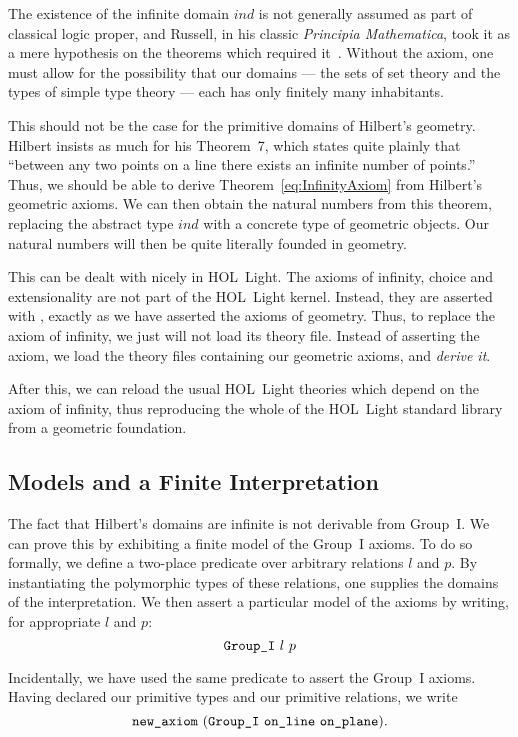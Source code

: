 The existence of the infinite domain $ind$ is not generally assumed as part of classical logic proper, and Russell, in his classic \emph{Principia Mathematica}, took it as a mere hypothesis on the theorems which required it~\cite{LogicismRevisited}. Without the axiom, one must allow for the possibility that our domains --- the sets of set theory and the types of simple type theory --- each has only finitely many inhabitants.

This should not be the case for the primitive domains of Hilbert's geometry. Hilbert insists as much for his Theorem~7, which states quite plainly that ``between any two points on a line there exists an infinite number of points.'' Thus, we should be able to derive Theorem~\ref{eq:InfinityAxiom} from Hilbert's geometric axioms. We can then obtain the natural numbers from this theorem, replacing the abstract type $ind$ with a concrete type of geometric objects. Our natural numbers will then be quite literally founded in geometry.

This can be dealt with nicely in HOL~Light. The axioms of infinity, choice and extensionality are not part of the HOL~Light kernel. Instead, they are asserted with , exactly as we have asserted the axioms of geometry. Thus, to replace the axiom of infinity, we just will not load its theory file. Instead of asserting the axiom, we load the theory files containing our geometric axioms, and \emph{derive it}. 

After this, we can reload the usual HOL~Light theories which depend on the axiom of infinity, thus reproducing the whole of the HOL~Light standard library from a geometric foundation.

\subsection{Models and a Finite Interpretation}
The fact that Hilbert's domains are infinite is not derivable from Group~I. We can prove this by exhibiting a finite model of the Group~I axioms. To do so formally, we define a two-place predicate  over arbitrary relations $l$ and $p$. By instantiating the polymorphic types of these relations, one supplies the domains of the interpretation. We then assert a particular model of the axioms by writing, for appropriate $l$ and $p$:
\begin{displaymath}
\texttt{Group\_I}\ l\ p
\end{displaymath}

Incidentally, we have used the same predicate to assert the Group~I axioms. Having declared our primitive types and our primitive relations, we write
\begin{displaymath}
  \code{new\_axiom}\ (\code{Group\_I}\ \code{on\_line}\ \code{on\_plane}).
\end{displaymath}

